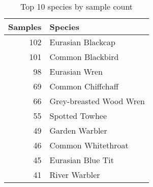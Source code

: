 \begin{table}[!htb]%
  \caption{Top 10 species by sample count}\label{tab:top10}
  \centering
    \begin{tabular}{r l}
      Samples & Species \\ \hline
      102 & Eurasian Blackcap\\
      101 & Common Blackbird\\
      98  & Eurasian Wren\\
      69  & Common Chiffchaff\\
      66  & Grey-breasted Wood Wren\\
      55  & Spotted Towhee\\
      49  & Garden Warbler\\
      46  & Common Whitethroat\\
      45  & Eurasian Blue Tit\\
      41  & River Warbler\\
    \end{tabular}
\end{table}

